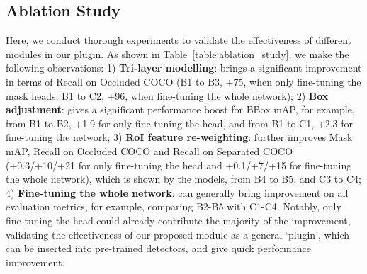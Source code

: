 \documentclass{bmvc2k}
\begin{document}
\subsection{Ablation Study}
\label{sec:ablation_study}
\vspace{-0.1cm}

Here, we conduct thorough experiments to validate the effectiveness of different modules in our plugin. As shown in Table~\ref{table:ablation_study}, we make the following observations: 
1) \textbf{Tri-layer modelling}:
brings a significant improvement in terms of Recall on Occluded COCO (B1 to B3, +75, when only fine-tuning the mask heads; B1 to C2, +96, when fine-tuning the whole network);
2) \textbf{Box adjustment}: gives a significant performance boost for BBox mAP, for example, from B1 to B2,  +1.9 for only fine-tuning the head, and from B1 to C1, +2.3 for fine-tuning the network;
3) \textbf{RoI feature re-weighting}: further improves  Mask mAP, Recall on Occluded COCO and Recall on Separated COCO (+0.3/+10/+21 for only fine-tuning the head and +0.1/+7/+15 for fine-tuning the whole network), which is shown by the models, from B4 to B5, and C3 to C4;
4) \textbf{Fine-tuning the whole network}: 
can generally bring improvement on all evaluation metrics,
for example, comparing B2-B5 with C1-C4. Notably, only fine-tuning the head could already contribute the majority of the improvement, validating the effectiveness of our proposed module as a general `plugin', which can be inserted into pre-trained detectors, and give quick performance improvement.
\end{document}
